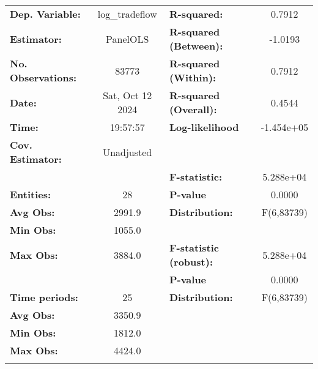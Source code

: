 \documentclass{article}
\begin{document}
\begin{center}
\begin{tabular}{lclc}
\toprule
\textbf{Dep. Variable:}    &   log\_tradeflow   & \textbf{  R-squared:         }   &      0.7912      \\
\textbf{Estimator:}        &      PanelOLS      & \textbf{  R-squared (Between):}  &     -1.0193      \\
\textbf{No. Observations:} &       83773        & \textbf{  R-squared (Within):}   &      0.7912      \\
\textbf{Date:}             &  Sat, Oct 12 2024  & \textbf{  R-squared (Overall):}  &      0.4544      \\
\textbf{Time:}             &      19:57:57      & \textbf{  Log-likelihood     }   &    -1.454e+05    \\
\textbf{Cov. Estimator:}   &     Unadjusted     & \textbf{                     }   &                  \\
\textbf{}                  &                    & \textbf{  F-statistic:       }   &    5.288e+04     \\
\textbf{Entities:}         &         28         & \textbf{  P-value            }   &      0.0000      \\
\textbf{Avg Obs:}          &       2991.9       & \textbf{  Distribution:      }   &    F(6,83739)    \\
\textbf{Min Obs:}          &       1055.0       & \textbf{                     }   &                  \\
\textbf{Max Obs:}          &       3884.0       & \textbf{  F-statistic (robust):} &    5.288e+04     \\
\textbf{}                  &                    & \textbf{  P-value            }   &      0.0000      \\
\textbf{Time periods:}     &         25         & \textbf{  Distribution:      }   &    F(6,83739)    \\
\textbf{Avg Obs:}          &       3350.9       & \textbf{                     }   &                  \\
\textbf{Min Obs:}          &       1812.0       & \textbf{                     }   &                  \\
\textbf{Max Obs:}          &       4424.0       & \textbf{                     }   &                  \\
\textbf{}                  &                    & \textbf{                     }   &                  \\
\bottomrule

\end{tabular}
\end{center}
\end{document}
